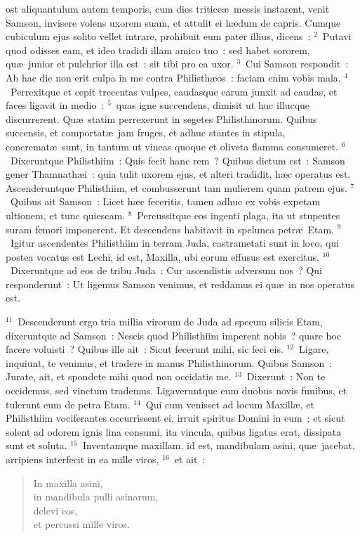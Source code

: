 \bchapter
{}ost aliquantulum autem temporis, cum dies tritice\ae\ messis instarent, venit Samson, invisere volens uxorem suam, et attulit ei h\ae dum de capris. Cumque cubiculum ejus solito vellet intrare, prohibuit eum pater illius, dicens~:
${}^{2}$~Putavi quod odisses eam, et ideo tradidi illam amico tuo~: sed habet sororem, qu\ae\ junior et pulchrior illa est~: sit tibi pro ea uxor.
${}^{3}$~Cui Samson respondit~: Ab hac die non erit culpa in me contra Philisth\ae os~: faciam enim vobis mala.
${}^{4}$~Perrexitque et cepit trecentas vulpes, caudasque earum junxit ad caudas, et faces ligavit in medio~:
${}^{5}$~quas igne succendens, dimisit ut huc illucque discurrerent. Qu\ae\ statim perrexerunt in segetes Philisthinorum. Quibus succensis, et comportat\ae\ jam fruges, et adhuc stantes in stipula, concremat\ae\ sunt, in tantum ut vineas quoque et oliveta flamma consumeret.
${}^{6}$~Dixeruntque Philisthiim~: Quis fecit hanc rem~? Quibus dictum est~: Samson gener Thamnath\ae i~: quia tulit uxorem ejus, et alteri tradidit, h\ae c operatus est. Ascenderuntque Philisthiim, et combusserunt tam mulierem quam patrem ejus.
${}^{7}$~Quibus ait Samson~: Licet h\ae c feceritis, tamen adhuc ex vobis expetam ultionem, et tunc quiescam.
${}^{8}$~Percussitque eos ingenti plaga, ita ut stupentes suram femori imponerent. Et descendens habitavit in spelunca petr\ae\ Etam.
${}^{9}$~Igitur ascendentes Philisthiim in terram Juda, castrametati sunt in loco, qui postea vocatus est Lechi, id est, Maxilla, ubi eorum effusus est exercitus.
${}^{10}$~Dixeruntque ad eos de tribu Juda~: Cur ascendistis adversum nos~? Qui responderunt~: Ut ligemus Samson venimus, et reddamus ei qu\ae\ in nos operatus est.


${}^{11}$~Descenderunt ergo tria millia virorum de Juda ad specum silicis Etam, dixeruntque ad Samson~: Nescis quod Philisthiim imperent nobis~? quare hoc facere voluisti~? Quibus ille ait~: Sicut fecerunt mihi, sic feci eis.
${}^{12}$~Ligare, inquiunt, te venimus, et tradere in manus Philisthinorum. Quibus Samson~: Jurate, ait, et spondete mihi quod non occidatis me.
${}^{13}$~Dixerunt~: Non te occidemus, sed vinctum trademus. Ligaveruntque eum duobus novis funibus, et tulerunt eum de petra Etam.
${}^{14}$~Qui cum venisset ad locum Maxill\ae , et Philisthiim vociferantes occurrissent ei, irruit spiritus Domini in eum~: et sicut solent ad odorem ignis lina consumi, ita vincula, quibus ligatus erat, dissipata sunt et soluta.
${}^{15}$~Inventamque maxillam, id est, mandibulam asini, qu\ae\ jacebat, arripiens interfecit in ea mille viros,
${}^{16}$~et ait~: \begin{verse}In maxilla asini,\\ in mandibula pulli asinarum,\\ delevi eos,\\ et percussi mille viros.\end{verse}


